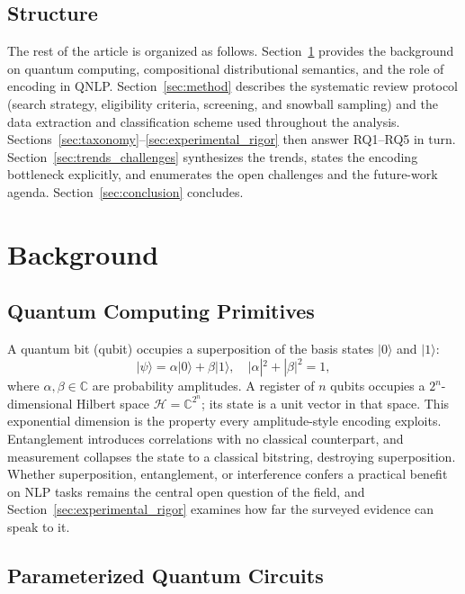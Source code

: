 \documentclass{ieeeaccess}
\begin{document}
\subsection{Structure}
The rest of the article is organized as follows. Section~\ref{sec:background} provides the background on quantum computing, compositional distributional semantics, and the role of encoding in QNLP. Section~\ref{sec:method} describes the systematic review protocol (search strategy, eligibility criteria, screening, and snowball sampling) and the data extraction and classification scheme used throughout the analysis. Sections~\ref{sec:taxonomy}--\ref{sec:experimental_rigor} then answer RQ1--RQ5 in turn. Section~\ref{sec:trends_challenges} synthesizes the trends, states the encoding bottleneck explicitly, and enumerates the open challenges and the future-work agenda. Section~\ref{sec:conclusion} concludes.

\section{Background}
\label{sec:background}

\subsection{Quantum Computing Primitives}

A quantum bit (qubit) occupies a superposition of the basis states $|0\rangle$ and $|1\rangle$:
\begin{equation}
|\psi\rangle = \alpha|0\rangle + \beta|1\rangle, \quad |\alpha|^2 + |\beta|^2 = 1,
\end{equation}
where $\alpha, \beta \in \mathbb{C}$ are probability amplitudes. A register of $n$ qubits occupies a $2^n$-dimensional Hilbert space $\mathcal{H} = \mathbb{C}^{2^n}$; its state is a unit vector in that space. This exponential dimension is the property every amplitude-style encoding exploits. Entanglement introduces correlations with no classical counterpart, and measurement collapses the state to a classical bitstring, destroying superposition. Whether superposition, entanglement, or interference confers a practical benefit on NLP tasks remains the central open question of the field, and Section~\ref{sec:experimental_rigor} examines how far the surveyed evidence can speak to it.

\subsection{Parameterized Quantum Circuits}
\end{document}
